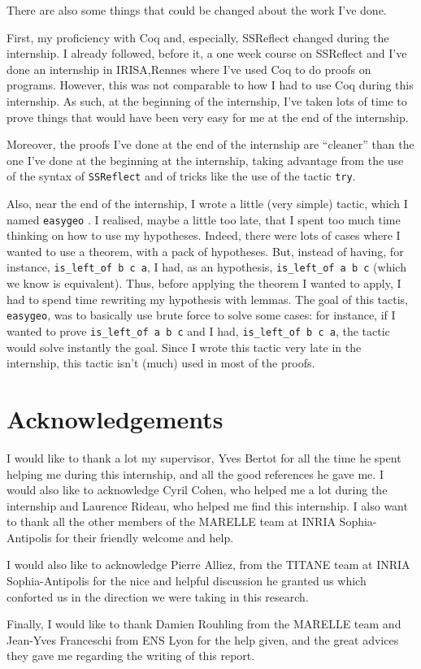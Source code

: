 \documentclass[a4paper,10pt]{article}
\begin{document}
There are also some things that could be changed about the work I've done.

First, my proficiency with {\sc Coq} and, especially, {\sc SSReflect} changed during the internship. I already followed, before it, a one week course on {\sc SSReflect} and I've done an internship in IRISA,Rennes where I've used {\sc Coq} to do proofs on programs. However, this was not comparable to how I had to use {\sc Coq} during this internship. As such, at the beginning of the internship, I've taken lots of time to prove things that would have been very easy for me at the end of the internship.

  Moreover, the proofs I've done at the end of the internship are ``cleaner'' than the one I've done at the beginning at the internship, taking advantage from the use of the syntax of {\tt SSReflect} and of tricks like the use of the tactic {\tt try}.

  Also, near the end of the internship, I wrote a little (very simple) tactic, which I named {\tt easygeo} \label{easygeo}. I realised, maybe a little too late, that I spent too much time thinking on how to use my hypotheses. Indeed, there were lots of cases where I wanted to use a theorem, with a pack of hypotheses. But, instead of having, for instance, {\tt is\_left\_of b c a}, I had, as an hypothesis, {\tt is\_left\_of a b c} (which we know is equivalent). Thus, before applying the theorem I wanted to apply, I had to spend time rewriting my hypothesis with lemmas. The goal of this tactis, {\tt easygeo}, was to basically use brute force to solve some cases: for instance, if I wanted to prove {\tt is\_left\_of a b c} and I had, {\tt is\_left\_of b c a}, the tactic would solve instantly the goal. Since I wrote this tactic very late in the internship, this tactic isn't (much) used in most of the proofs.

\section{Acknowledgements}
I would like to thank a lot my supervisor, Yves Bertot for all the time he spent helping me during this internship, and all the good references he gave me. I would also like to acknowledge Cyril Cohen, who helped me a lot during the internship and Laurence Rideau, who helped me find this internship. I also want to thank all the other members of the MARELLE team at INRIA Sophia-Antipolis for their friendly welcome and help.

I would also like to acknowledge Pierre Alliez, from the TITANE team at INRIA Sophia-Antipolis for the nice and helpful discussion he granted us which conforted us in the direction we were taking in this research.

Finally, I would like to thank Damien Rouhling from the MARELLE team and Jean-Yves Franceschi from ENS Lyon for the help given, and the great advices they gave me regarding the writing of this report.

\newpage


\end{document}

